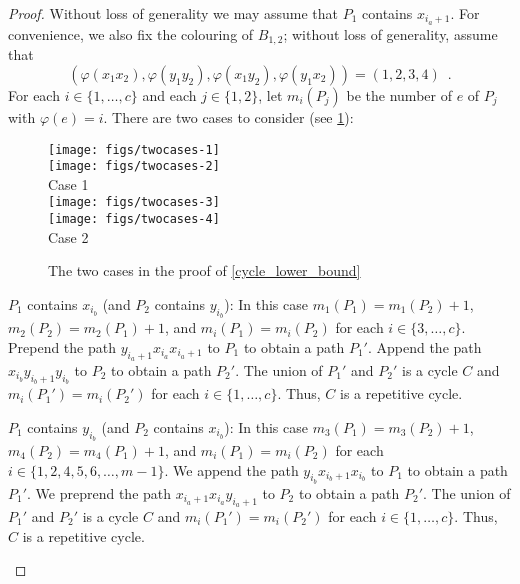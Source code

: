\documentclass[kpfonts]{patmorin}
\begin{document}
\begin{proof}

    Without loss of generality we may assume that $P_1$ contains $x_{i_a+1}$.  For convenience, we also fix the colouring of $B_{1,2}$; without loss of generality, assume that
    \[
        (\varphi(x_1x_2),\varphi(y_1y_2),\varphi(x_1y_2),\varphi(y_1x_2))=(1,2,3,4) \enspace .
    \]
    For each $i\in\{1,\ldots,c\}$ and each $j\in\{1,2\}$, let $m_i(P_j)$ be the number of $e$ of $P_j$ with $\varphi(e)=i$.  There are two cases to consider (see \cref{cases}):
    \begin{figure}
        \begin{center}
            \texttt{[image: figs/twocases-1]} \\
            \texttt{[image: figs/twocases-2]} \\
            Case 1 \\[2em]
            \texttt{[image: figs/twocases-3]} \\
            \texttt{[image: figs/twocases-4]} \\
            Case 2
        \end{center}
        \caption{The two cases in the proof of \cref{cycle_lower_bound}}
        \label{cases}
    \end{figure}
    \begin{compactenum}
        \item $P_1$ contains $x_{i_b}$ (and $P_2$ contains $y_{i_b}$):  In this case $m_1(P_1)=m_1(P_2)+1$, $m_2(P_2)=m_2(P_1)+1$, and $m_i(P_1)=m_i(P_2)$ for each $i\in\{3,\ldots,c\}$.  Prepend the path $y_{i_a+1}x_{i_a}x_{i_a+1}$ to $P_1$ to obtain a path $P_1'$.  Append the path $x_{i_b}y_{i_b+1}y_{i_b}$ to $P_2$ to obtain a path $P_2'$.  The union of $P_1'$ and $P_2'$ is a cycle $C$ and $m_i(P_1')=m_i(P_2')$ for each $i\in\{1,\ldots,c\}$. Thus, $C$ is a repetitive cycle.

        \item $P_1$ contains $y_{i_b}$ (and $P_2$ contains $x_{i_b}$): In this case $m_3(P_1)=m_3(P_2)+1$, $m_4(P_2)=m_4(P_1)+1$, and $m_i(P_1)=m_i(P_2)$ for each $i\in\{1,2,4,5,6,\ldots,m-1\}$.  We append the path $y_{i_b}x_{i_b+1}x_{i_b}$ to $P_1$ to obtain a path $P_1'$.  We preprend the path $x_{i_a+1}x_{i_a}y_{i_a+1}$ to $P_2$ to obtain a path $P_2'$.  The union of $P_1'$ and $P_2'$ is a cycle $C$ and $m_i(P_1')=m_i(P_2')$ for each $i\in\{1,\ldots,c\}$.  Thus, $C$ is a repetitive cycle. \qedhere
    \end{compactenum}
\end{proof}
\end{document}
